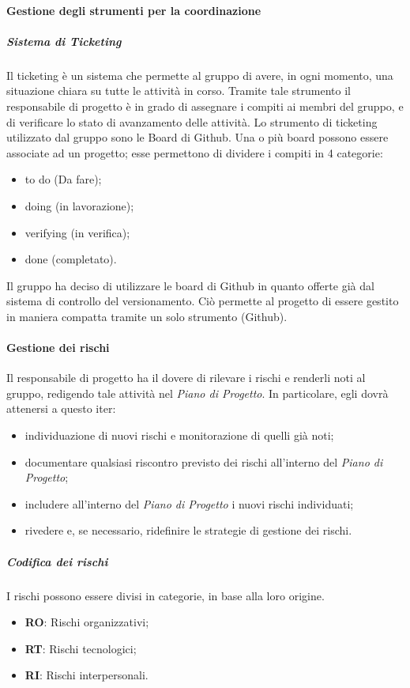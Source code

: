 			
			\paragraph{Gestione degli strumenti per la coordinazione}
			
				\subparagraph{Sistema di Ticketing}
				Il ticketing è un sistema che permette al gruppo di avere, in ogni momento, una situazione chiara su tutte le attività in corso. Tramite tale strumento il responsabile di progetto è in grado di assegnare i compiti ai membri del gruppo, e di verificare lo stato di avanzamento delle attività. Lo strumento di ticketing utilizzato dal gruppo sono le Board di Github. Una o più board possono essere associate ad un progetto; esse permettono di dividere i compiti in 4 categorie:
					\begin{itemize}
						\item to do (Da fare);
						\item doing (in lavorazione);
						\item verifying (in verifica);
						\item done (completato).
					\end{itemize}
				Il gruppo ha deciso di utilizzare le board di Github in quanto offerte già dal sistema di controllo del versionamento. Ciò permette al progetto di essere gestito in maniera compatta tramite un solo strumento (Github).
			
			
			\paragraph{Gestione dei rischi}
			Il responsabile di progetto ha il dovere di rilevare i rischi e renderli noti al gruppo, redigendo tale attività nel \textit{Piano di Progetto}. In particolare, egli dovrà attenersi a questo iter:
			\begin{itemize}
				\item individuazione di nuovi rischi e monitorazione di quelli già noti;
				\item documentare qualsiasi riscontro previsto dei rischi all'interno del \textit{Piano di Progetto};
				\item includere all'interno del \textit{Piano di Progetto} i nuovi rischi individuati;
				\item rivedere e, se necessario, ridefinire le strategie di gestione dei rischi.
			\end{itemize}
			
				\subparagraph{Codifica dei rischi}
				I rischi possono essere divisi in categorie, in base alla loro origine.
				\begin{itemize}
					\item \textbf{RO}: Rischi organizzativi;
					\item \textbf{RT}: Rischi tecnologici;
					\item \textbf{RI}: Rischi interpersonali.	
				\end{itemize}
			
